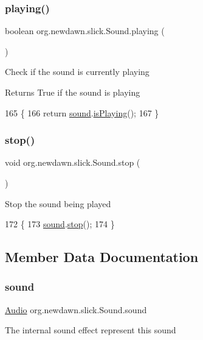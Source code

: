 \subsubsection{\texorpdfstring{playing()}{playing()}}
{\footnotesize\ttfamily boolean org.\+newdawn.\+slick.\+Sound.\+playing (\begin{DoxyParamCaption}{ }\end{DoxyParamCaption})\hspace{0.3cm}{\ttfamily [inline]}}

Check if the sound is currently playing

\begin{DoxyReturn}{Returns}
True if the sound is playing 
\end{DoxyReturn}

\begin{DoxyCode}
165                              \{
166         \textcolor{keywordflow}{return} \mbox{\hyperlink{classorg_1_1newdawn_1_1slick_1_1_sound_aefd4460784b86c7003356f59cafe3dc8}{sound}}.\mbox{\hyperlink{interfaceorg_1_1newdawn_1_1slick_1_1openal_1_1_audio_a842b49128a58be8c4473cbcc8ee4ad9e}{isPlaying}}();
167     \}
\end{DoxyCode}
\mbox{\label{classorg_1_1newdawn_1_1slick_1_1_sound_a92f5c4af5d3a5a0b26dcf3c6ebb93433}} 
\subsubsection{\texorpdfstring{stop()}{stop()}}
{\footnotesize\ttfamily void org.\+newdawn.\+slick.\+Sound.\+stop (\begin{DoxyParamCaption}{ }\end{DoxyParamCaption})\hspace{0.3cm}{\ttfamily [inline]}}

Stop the sound being played 
\begin{DoxyCode}
172                        \{
173         \mbox{\hyperlink{classorg_1_1newdawn_1_1slick_1_1_sound_aefd4460784b86c7003356f59cafe3dc8}{sound}}.\mbox{\hyperlink{interfaceorg_1_1newdawn_1_1slick_1_1openal_1_1_audio_a8346ca83b84cb6605efb695462f12337}{stop}}();
174     \}
\end{DoxyCode}


\subsection{Member Data Documentation}
\mbox{\label{classorg_1_1newdawn_1_1slick_1_1_sound_aefd4460784b86c7003356f59cafe3dc8}} 
\subsubsection{\texorpdfstring{sound}{sound}}
{\footnotesize\ttfamily \mbox{\hyperlink{interfaceorg_1_1newdawn_1_1slick_1_1openal_1_1_audio}{Audio}} org.\+newdawn.\+slick.\+Sound.\+sound\hspace{0.3cm}{\ttfamily [private]}}

The internal sound effect represent this sound 
